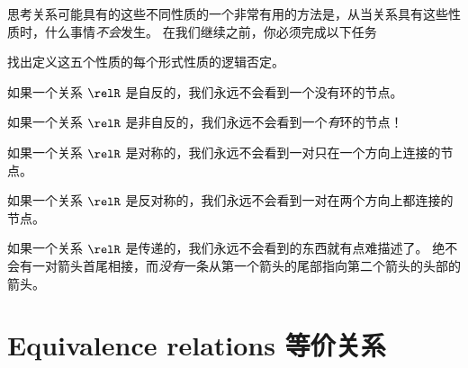 思考关系可能具有的这些不同性质的一个非常有用的方法是，从当关系具有这些性质时，什么事情\emph{不会}发生。
在我们继续之前，你必须完成以下任务

\begin{exer}
找出定义这五个性质的每个形式性质的逻辑否定。
\end{exer}

\newpage

如果一个关系 $\relR$ 是自反的，我们永远不会看到一个没有环的节点。

\begin{center}

\end{center}

\vfill

如果一个关系 $\relR$ 是非自反的，我们永远不会看到一个\emph{有}环的节点！

\begin{center}

\end{center}

\vfill

如果一个关系 $\relR$ 是对称的，我们永远不会看到一对只在一个方向上连接的节点。

\begin{center}

\end{center}

\vfill

\newpage

如果一个关系 $\relR$ 是反对称的，我们永远不会看到一对在两个方向上都连接的节点。

\begin{center}

\end{center}

\vfill

如果一个关系 $\relR$ 是传递的，我们永远不会看到的东西就有点难描述了。
绝不会有一对箭头首尾相接，而\emph{没有}一条从第一个箭头的尾部指向第二个箭头的头部的箭头。

\begin{center}

\end{center}

\vfill

\newpage




\newpage

\section{Equivalence relations 等价关系}
\label{sec:eq_rel}

